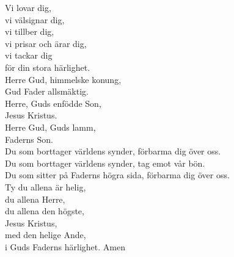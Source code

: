 \begin{multicols}{2}
Vi lovar dig, \\
vi välsignar dig,\\ 
vi tillber dig,\\ 
vi prisar och ärar dig,\\ 
vi tackar dig \\
för din stora härlighet.\\
Herre Gud, himmelske konung,\\ 
Gud Fader allsmäktig.\\ Herre, Guds enfödde Son,\\
Jesus Kristus.\\
Herre Gud, Guds lamm,\\
Faderns Son. \\
Du som borttager världens synder,
förbarma dig över oss.\\
Du som borttager världens synder, 
tag emot vår bön.\\
Du som sitter på Faderns högra sida, 
förbarma dig över oss.\\
Ty du allena är helig, \\
du allena Herre,\\
du allena den högste, \\ Jesus Kristus, \\
med den helige Ande,\\
i Guds Faderns härlighet.
Amen
\end{multicols}